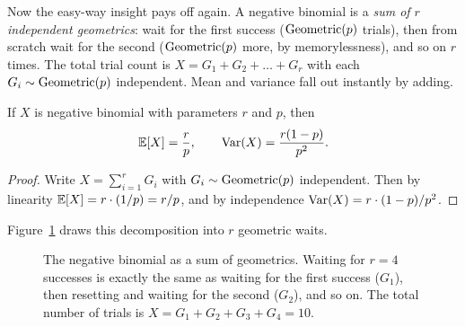 Now the easy-way insight pays off again. A negative binomial is a \emph{sum of
$r$ independent geometrics}: wait for the first success ($\operatorname{Geometric}(p)$ trials), then
from scratch wait for the second ($\operatorname{Geometric}(p)$ more, by memorylessness), and so on
$r$ times. The total trial count is $X = G_1 + G_2 + \dots + G_r$ with each
$G_i \sim \operatorname{Geometric}(p)$ independent. Mean and variance fall out instantly by adding.

\begin{proposition}
\label{ch07:negbinom-mv}
If $X$ is negative binomial with parameters $r$ and $p$, then
\[
  \operatorname{\mathbb{E}}[X] = \frac{r}{p}, \qquad \operatorname{Var}(X) = \frac{r(1-p)}{p^{2}}.
\]
\end{proposition}

\begin{proof}
Write $X = \sum_{i=1}^{r} G_i$ with $G_i \sim \operatorname{Geometric}(p)$ independent. Then by
linearity $\operatorname{\mathbb{E}}[X] = r \cdot (1/p) = r/p$, and by independence
$\operatorname{Var}(X) = r \cdot (1-p)/p^2$.
\end{proof}
Figure~\ref{ch07:fig-negbinom-sum} draws this decomposition into $r$ geometric waits.
\begin{figure}[H]
\centering
{}
\caption{The negative binomial as a sum of geometrics. Waiting for $r=4$ successes is exactly the same as waiting for the first success ($G_1$), then resetting and waiting for the second ($G_2$), and so on. The total number of trials is $X = G_1 + G_2 + G_3 + G_4 = 10$.}
\label{ch07:fig-negbinom-sum}
\end{figure}

